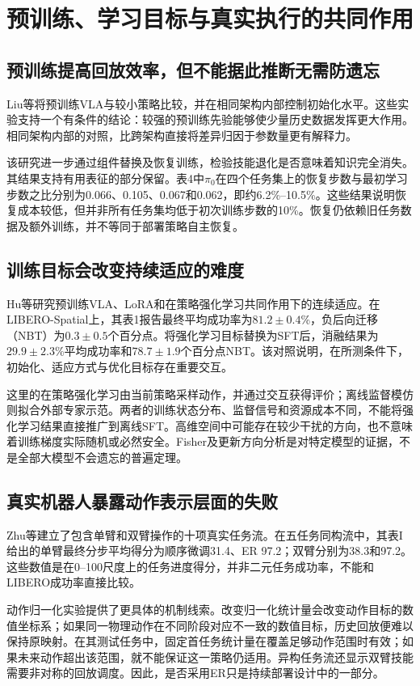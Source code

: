 \documentclass[UTF8,11pt,a4paper,fontset=fandol]{ctexart}
\begin{document}
\section{预训练、学习目标与真实执行的共同作用}
\subsection{预训练提高回放效率，但不能据此推断无需防遗忘}
Liu等将预训练VLA与较小策略比较，并在相同架构内部控制初始化水平\cite{liu_er}。这些实验支持一个有条件的结论：较强的预训练先验能够使少量历史数据发挥更大作用。相同架构内部的对照，比跨架构直接将差异归因于参数量更有解释力。

该研究进一步通过组件替换及恢复训练，检验技能退化是否意味着知识完全消失。其结果支持有用表征的部分保留。表4中$\pi_0$在四个任务集上的恢复步数与最初学习步数之比分别为0.066、0.105、0.067和0.062，即约6.2\%--10.5\%。这些结果说明恢复成本较低，但并非所有任务集均低于初次训练步数的10\%。恢复仍依赖旧任务数据及额外训练，并不等同于部署策略自主恢复。

\subsection{训练目标会改变持续适应的难度}
Hu等研究预训练VLA、LoRA和在策略强化学习共同作用下的连续适应\cite{hu_rl}。在LIBERO-Spatial上，其表1报告最终平均成功率为$81.2\pm0.4$\%，负后向迁移（NBT）为$0.3\pm0.5$个百分点。将强化学习目标替换为SFT后，消融结果为$29.9\pm2.3$\%平均成功率和$78.7\pm1.9$个百分点NBT。该对照说明，在所测条件下，初始化、适应方式与优化目标存在重要交互。

这里的在策略强化学习由当前策略采样动作，并通过交互获得评价；离线监督模仿则拟合外部专家示范。两者的训练状态分布、监督信号和资源成本不同，不能将强化学习结果直接推广到离线SFT。高维空间中可能存在较少干扰的方向，也不意味着训练梯度实际随机或必然安全。Fisher及更新方向分析是对特定模型的证据，不是全部大模型不会遗忘的普遍定理。

\subsection{真实机器人暴露动作表示层面的失败}
Zhu等建立了包含单臂和双臂操作的十项真实任务流\cite{zhu_real}。在五任务同构流中，其表I给出的单臂最终分步平均得分为顺序微调31.4、ER 97.2；双臂分别为38.3和97.2。这些数值是在0--100尺度上的任务进度得分，并非二元任务成功率，不能和LIBERO成功率直接比较。

动作归一化实验提供了更具体的机制线索。改变归一化统计量会改变动作目标的数值坐标系；如果同一物理动作在不同阶段对应不一致的数值目标，历史回放便难以保持原映射。在其测试任务中，固定首任务统计量在覆盖足够动作范围时有效；如果未来动作超出该范围，就不能保证这一策略仍适用。异构任务流还显示双臂技能需要非对称的回放调度。因此，是否采用ER只是持续部署设计中的一部分。
\end{document}

